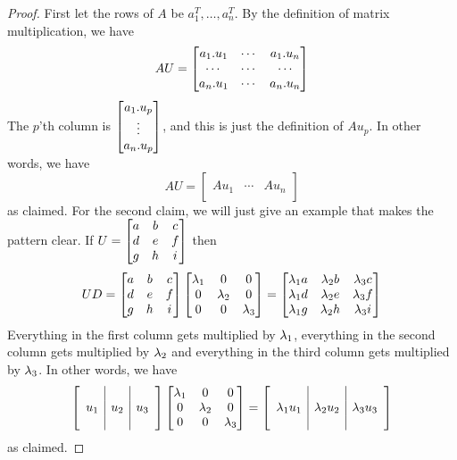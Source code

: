 \documentclass[reqno]{amsart}
\theoremstyle{definition}
\begin{document}
\begin{proof}
 First let the rows of $A$ be $a_1^T,\dotsc,a_n^T$.  By the definition
 of matrix multiplication, we have
 \[ AU = 
     \left[\begin{matrix} 
      a_1.u_1 & \cdots & a_1.u_n \\
      \cdots  & \cdots & \cdots \\
      a_n.u_1 & \cdots & a_n.u_n
     \end{matrix}\right] 
 \]
 The $p$'th column is $\left[\begin{matrix} a_1.u_p \\ \vdots \\ a_n.u_p\end{matrix}\right]$, and
 this is just the definition of $Au_p$.  In other words, we have 
 \[ AU = \left[\begin{array}{c|c|c}
         && \\ Au_1 & \cdots & Au_n \\ &&
        \end{array}\right]
 \]
 as claimed.  For the second claim, we will just give an example that
 makes the pattern clear.  If $U=\left[\begin{matrix} a&b&c\\ d&e&f \\ g&h&i\end{matrix}\right]$ then 
 \[ UD = 
     \left[\begin{matrix} a&b&c\\ d&e&f \\ g&h&i\end{matrix}\right] 
     \left[\begin{matrix} \lambda_1 & 0 & 0 \\ 0 & \lambda_2 & 0 \\ 0 & 0 & \lambda_3 \end{matrix}\right] 
     =
     \left[\begin{matrix} 
      \lambda_1 a & \lambda_2 b & \lambda_3 c \\
      \lambda_1 d & \lambda_2 e & \lambda_3 f \\
      \lambda_1 g & \lambda_2 h & \lambda_3 i
     \end{matrix}\right]
 \]
 Everything in the first column gets multiplied by $\lambda_1$, everything
 in the second column gets multiplied by $\lambda_2$ and everything in the
 third column gets multiplied by $\lambda_3$.  In other words, we have
 \[ 
  \left[\begin{array}{c|c|c}
   && \\ u_1 & u_2 & u_3 \\ &&
  \end{array}\right]
  \left[\begin{matrix} \lambda_1 & 0 & 0 \\ 0 & \lambda_2 & 0 \\ 0 & 0 & \lambda_3 \end{matrix}\right]  =
  \left[\begin{array}{c|c|c}
   && \\ \lambda_1u_1 & \lambda_2u_2 & \lambda_3u_3 \\ &&
  \end{array}\right]
 \]
 as claimed.
\end{proof}
\end{document}
